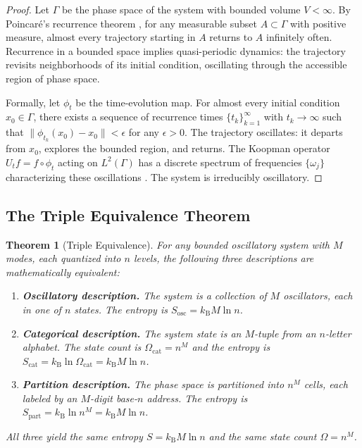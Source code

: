 \documentclass[11pt,twocolumn,a4paper]{article}
\newtheorem{theorem}{Theorem}[section]
\theoremstyle{definition}
\theoremstyle{remark}
\newcommand{\kB}{k_{\mathrm{B}}}
\begin{document}
\begin{proof}
Let $\Gamma$ be the phase space of the system with bounded volume $V < \infty$. By Poincar\'{e}'s recurrence theorem \citep{poincare1890}, for any measurable subset $A \subset \Gamma$ with positive measure, almost every trajectory starting in $A$ returns to $A$ infinitely often. Recurrence in a bounded space implies quasi-periodic dynamics: the trajectory revisits neighborhoods of its initial condition, oscillating through the accessible region of phase space.

Formally, let $\phi_t$ be the time-evolution map. For almost every initial condition $x_0 \in \Gamma$, there exists a sequence of recurrence times $\{t_k\}_{k=1}^{\infty}$ with $t_k \to \infty$ such that $\|\phi_{t_k}(x_0) - x_0\| < \epsilon$ for any $\epsilon > 0$. The trajectory oscillates: it departs from $x_0$, explores the bounded region, and returns. The Koopman operator $U_t f = f \circ \phi_t$ acting on $L^2(\Gamma)$ has a discrete spectrum of frequencies $\{\omega_j\}$ characterizing these oscillations \citep{koopman1931}. The system is irreducibly oscillatory.
\end{proof}

\subsection{The Triple Equivalence Theorem}

\begin{theorem}[Triple Equivalence]
\label{thm:triple_equiv}
For any bounded oscillatory system with $M$ modes, each quantized into $n$ levels, the following three descriptions are mathematically equivalent:
\begin{enumerate}[nosep]
\item \textbf{Oscillatory description.} The system is a collection of $M$ oscillators, each in one of $n$ states. The entropy is $S_{\mathrm{osc}} = \kB M \ln n$.
\item \textbf{Categorical description.} The system state is an $M$-tuple from an $n$-letter alphabet. The state count is $\Omega_{\mathrm{cat}} = n^M$ and the entropy is $S_{\mathrm{cat}} = \kB \ln \Omega_{\mathrm{cat}} = \kB M \ln n$.
\item \textbf{Partition description.} The phase space is partitioned into $n^M$ cells, each labeled by an $M$-digit base-$n$ address. The entropy is $S_{\mathrm{part}} = \kB \ln n^M = \kB M \ln n$.
\end{enumerate}
All three yield the same entropy $S = \kB M \ln n$ and the same state count $\Omega = n^M$.
\end{theorem}
\end{document}
